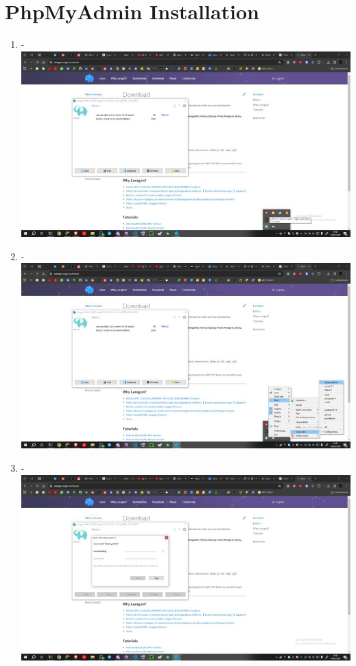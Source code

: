 \documentclass[12pt,titlepage]{article}
\begin{document}
\begin{enumerate}[label= \alph*.]
\end{enumerate}

\newpage

\section{PhpMyAdmin Installation}

\begin{enumerate}[label= \alph*.]
    \item - \\ \includegraphics[width=.9\textwidth]{images/figures/PHPMyAdmin 1.jpg}
    \item - \\ \includegraphics[width=.9\textwidth]{images/figures/PHPMyAdmin 2.jpg}
    \newpage
    \item - \\ \includegraphics[width=.9\textwidth]{images/figures/PHPMyAdmin 3.jpg}

\end{enumerate}
\end{document}
